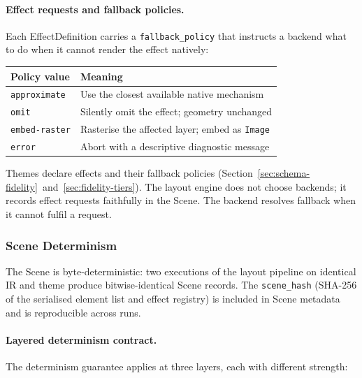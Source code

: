 \paragraph{Effect requests and fallback policies.}
Each EffectDefinition carries a \texttt{fallback\_policy} that instructs a backend what to
do when it cannot render the effect natively:

\begin{center}
\small
\begin{tabular}{ll}
\toprule
\textbf{Policy value} & \textbf{Meaning} \\
\midrule
\texttt{approximate}  & Use the closest available native mechanism \\
\texttt{omit}         & Silently omit the effect; geometry unchanged \\
\texttt{embed-raster} & Rasterise the affected layer; embed as \texttt{Image} \\
\texttt{error}        & Abort with a descriptive diagnostic message \\
\bottomrule
\end{tabular}
\end{center}

Themes declare effects and their fallback policies
(Section~\ref{sec:schema-fidelity}~and~\ref{sec:fidelity-tiers}). The layout engine does
not choose backends; it records effect requests faithfully in the Scene. The backend
resolves fallback when it cannot fulfil a request.

\subsubsection{Scene Determinism}
\label{sec:scene-determinism}

The Scene is byte-deterministic: two executions of the layout pipeline on identical IR and
theme produce bitwise-identical Scene records. The \texttt{scene\_hash} (SHA-256 of the
serialised element list and effect registry) is included in Scene metadata and is
reproducible across runs.

\paragraph{Layered determinism contract.}
The determinism guarantee applies at three layers, each with different strength:

